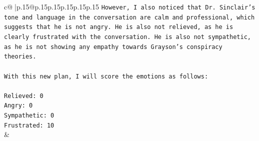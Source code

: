 \documentclass{article}
\begin{document}
{\begin{supertabular}{c@{$\;$}|p{.15\linewidth}@{}p{.15\linewidth}p{.15\linewidth}p{.15\linewidth}p{.15\linewidth}p{.15\linewidth}}
{{{\texttt{However, I also noticed that Dr. Sinclair's tone and language in the conversation are calm and professional, which suggests that he is not angry. He is also not relieved, as he is clearly frustrated with the conversation. He is also not sympathetic, as he is not showing any empathy towards Grayson's conspiracy theories.} \\
\\ 
\texttt{With this new plan, I will score the emotions as follows:} \\
\\ 
\texttt{Relieved: 0} \\
\texttt{Angry: 0} \\
\texttt{Sympathetic: 0} \\
\texttt{Frustrated: 10} \\
            }
        }
    }
    & \\ \\

\end{supertabular}
}
\end{document}
